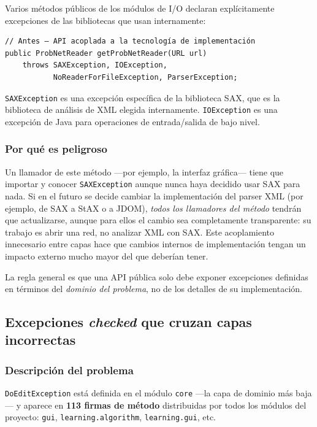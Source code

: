 \documentclass[11pt,a4paper]{article}
\begin{document}
Varios métodos públicos de los módulos de I/O declaran explícitamente excepciones de las
bibliotecas que usan internamente:

\begin{lstlisting}[caption={API que expone detalles de implementación},label={lst:api-exposicion}]
// Antes — API acoplada a la tecnología de implementación
public ProbNetReader getProbNetReader(URL url)
    throws SAXException, IOException,
           NoReaderForFileException, ParserException;
\end{lstlisting}

\texttt{SAXException} es una excepción específica de la biblioteca SAX, que es la biblioteca de
análisis de XML elegida internamente. \texttt{IOException} es una excepción de Java para
operaciones de entrada/salida de bajo nivel.

\subsubsection{Por qué es peligroso}

Un llamador de este método —por ejemplo, la interfaz gráfica— tiene que importar y conocer
\texttt{SAXException} aunque nunca haya decidido usar SAX para nada. Si en el futuro se decide
cambiar la implementación del parser XML (por ejemplo, de SAX a StAX o a JDOM), \emph{todos los
llamadores del método} tendrán que actualizarse, aunque para ellos el cambio sea completamente
transparente: su trabajo es \guillemotleft abrir una red\guillemotright , no \guillemotleft analizar XML con SAX\guillemotright . Este acoplamiento
innecesario entre capas hace que cambios internos de implementación tengan un impacto externo
mucho mayor del que deberían tener.

La regla general es que una API pública solo debe exponer excepciones definidas en términos del
\emph{dominio del problema}, no de los detalles de su implementación.

\subsection{Excepciones \textit{checked} que cruzan capas incorrectas}

\subsubsection{Descripción del problema}

\texttt{DoEditException} está definida en el módulo \texttt{core} —la capa de dominio más
baja— y aparece en \textbf{113 firmas de método} distribuidas por todos los módulos del
proyecto: \texttt{gui}, \texttt{learning.algorithm}, \texttt{learning.gui}, etc.
\end{document}
